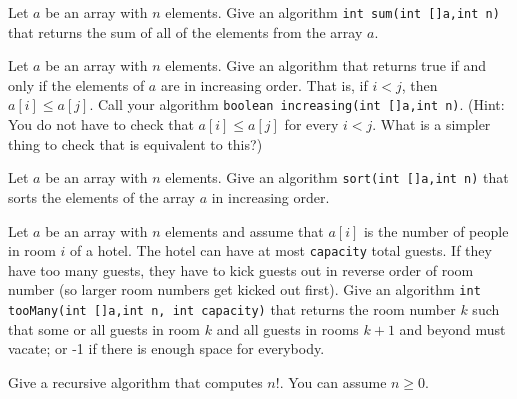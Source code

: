 \begin{pro}
Let $a$ be an array with $n$ elements.
Give an algorithm \verb+int sum(int []a,int n)+ that returns the sum of all of the elements 
from the array $a$.
\end{pro}


\begin{pro}
Let $a$ be an array with $n$ elements.
Give an algorithm that returns true if and only if the elements of $a$ are in increasing order.
That is, if $i<j$, then $a[i]\leq a[j]$.
Call your algorithm \verb+boolean increasing(int []a,int n)+.
(Hint: You do not have to check that $a[i]\leq a[j]$ for every $i<j$. What is a simpler
thing to check that is equivalent to this?)
\end{pro}

\begin{pro}
Let $a$ be an array with $n$ elements.
Give an algorithm \verb+sort(int []a,int n)+ 
that sorts the elements of the array $a$ in increasing order.
\end{pro}


\begin{pro}
Let $a$ be an array with $n$ elements and assume that $a[i]$ is the number of 
people in room $i$ of a hotel.
The hotel can have at most \verb+capacity+ total guests. If they have too many guests,
they have to kick guests out in reverse order of room number (so larger room numbers get kicked out first).
Give an algorithm \verb+int tooMany(int []a,int n, int capacity)+ 
that returns the room number $k$ such that some or all guests in room $k$ and all guests 
in rooms $k+1$ and beyond must vacate;
or -1 if there is enough space for everybody. 
\end{pro}


\begin{pro}
Give a recursive algorithm that computes $n!$.  You can assume $n\geq 0$.
\end{pro}

